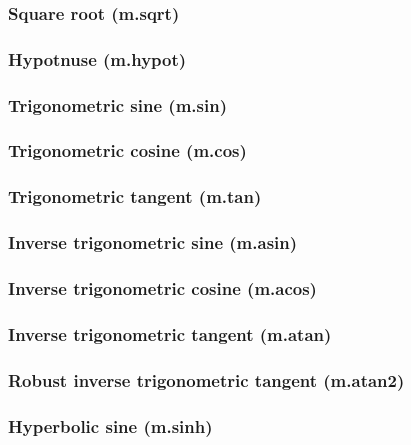 \documentclass{article}
\theoremstyle{definition}
\begin{document}
\subsubsection{Square root (m.sqrt)}

\subsubsection{Hypotnuse (m.hypot)}

\subsubsection{Trigonometric sine (m.sin)}

\subsubsection{Trigonometric cosine (m.cos)}

\subsubsection{Trigonometric tangent (m.tan)}

\subsubsection{Inverse trigonometric sine (m.asin)}

\subsubsection{Inverse trigonometric cosine (m.acos)}

\subsubsection{Inverse trigonometric tangent (m.atan)}

\subsubsection{Robust inverse trigonometric tangent (m.atan2)}

\subsubsection{Hyperbolic sine (m.sinh)}
\end{document}
